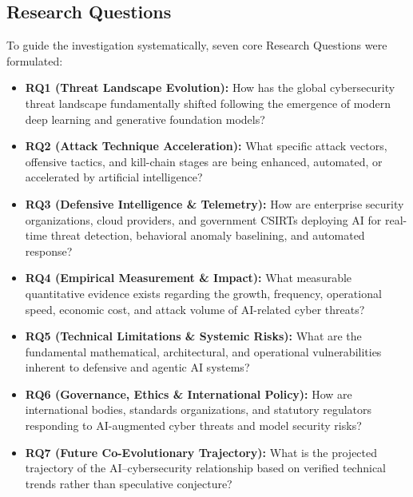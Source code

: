\documentclass[conference,10pt,twocolumn,a4paper]{IEEEtran}
\begin{document}
\subsection{Research Questions}
To guide the investigation systematically, seven core Research Questions were formulated:
\begin{itemize}
    \item \textbf{RQ1 (Threat Landscape Evolution):} How has the global cybersecurity threat landscape fundamentally shifted following the emergence of modern deep learning and generative foundation models?
    \item \textbf{RQ2 (Attack Technique Acceleration):} What specific attack vectors, offensive tactics, and kill-chain stages are being enhanced, automated, or accelerated by artificial intelligence?
    \item \textbf{RQ3 (Defensive Intelligence \& Telemetry):} How are enterprise security organizations, cloud providers, and government CSIRTs deploying AI for real-time threat detection, behavioral anomaly baselining, and automated response?
    \item \textbf{RQ4 (Empirical Measurement \& Impact):} What measurable quantitative evidence exists regarding the growth, frequency, operational speed, economic cost, and attack volume of AI-related cyber threats?
    \item \textbf{RQ5 (Technical Limitations \& Systemic Risks):} What are the fundamental mathematical, architectural, and operational vulnerabilities inherent to defensive and agentic AI systems?
    \item \textbf{RQ6 (Governance, Ethics \& International Policy):} How are international bodies, standards organizations, and statutory regulators responding to AI-augmented cyber threats and model security risks?
    \item \textbf{RQ7 (Future Co-Evolutionary Trajectory):} What is the projected trajectory of the AI--cybersecurity relationship based on verified technical trends rather than speculative conjecture?
\end{itemize}
\end{document}
